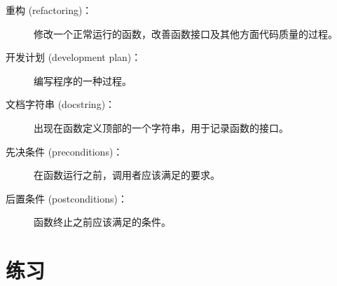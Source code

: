 \begin{description}
\item[重构 (refactoring)：]
    修改一个正常运行的函数，改善函数接口及其他方面代码质量的过程。


\item[开发计划 (development plan)：]
    编写程序的一种过程。


\item[文档字符串 (docstring)：]
    出现在函数定义顶部的一个字符串，用于记录函数的接口。


\item[先决条件 (preconditions)：]
    在函数运行之前，调用者应该满足的要求。


\item[后置条件 (postconditions)：]
    函数终止之前应该满足的条件。

\end{description}


\section{练习}

